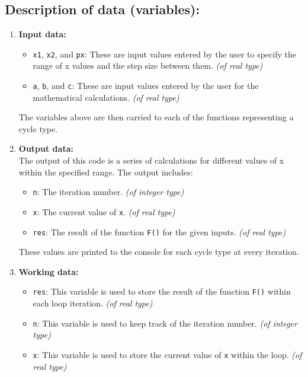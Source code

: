 \documentclass[a4paper, 11p]{article}
\begin{document}
\subsection{Description of data (variables): }
\begin{enumerate}[label=\alph*)]
    \item \textbf{Input data:}  
        \begin{itemize}
            \item \texttt{x1}, \texttt{x2}, and \texttt{px}: These are input values entered by the user to specify the range of x values and the step size between them. \textit{(of real type)}
            \item \texttt{a}, \texttt{b}, and \texttt{c}: These are input values entered by the user for the mathematical calculations. \textit{(of real type)}
        \end{itemize}
        The variables above are then carried to each of the functions representing a cycle type.

    \item \textbf{Output data:} \\
        The output of this code is a series of calculations for different values of x within the specified range. The output includes:
        \begin{itemize}
            \item \texttt{n}: The iteration number. \textit{(of integer type)}
            \item \texttt{x}: The current value of \texttt{x}. \textit{(of real type)}
            \item \texttt{res}: The result of the function \texttt{F()} for the given inputs. \textit{(of real type)}
        \end{itemize}
        These values are printed to the console for each cycle type at every iteration.

    \item \textbf{Working data:}
        \begin{itemize}
            \item \texttt{res}: This variable is used to store the result of the function \texttt{F()} within each loop iteration. \textit{(of real type)}
            \item \texttt{n}: This variable is used to keep track of the iteration number. \textit{(of integer type)}
            \item \texttt{x}: This variable is used to store the current value of \texttt{x} within the loop. \textit{(of real type)}
        \end{itemize}
\end{enumerate}
\pagebreak
\end{document}
